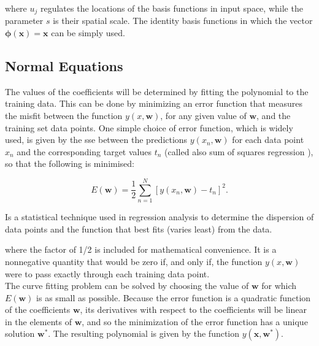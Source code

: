 \noindent where $u_j$ regulates the locations of the basis functions in input space, while the parameter $s$ is their spatial scale.
\noindent The identity basis functions in which the vector $\bm{\phi}(\bm{x})=\bm{x}$ can be simply used.

\subsection{Normal Equations}
\label{subsec:reglinmulnormeq}
The values of the coefficients will be determined by fitting the polynomial to the training data. This can be done by minimizing an error function that measures the misfit between the function $y(x, \bm{w})$, for any given value of $\bm{w}$, and the training set data points. One simple choice of error function, which is widely used, is given by the \gls{sse} between the predictions $y(x_n, \bm{w})$ for each data point $x_n$ and the corresponding target values $t_n$ (called also sum of squares regression \cite[]{sum-squares}), so that the following is minimised:

\begin{Equation}[H]
	\centering
	\begin{equation} \label{eq:sumsquarereg}
		E(\bm{w})=\frac{1}{2} \sum_{n=1}^{N} [y(x_n, \bm{w})-t_n]^2 .
	\end{equation}
	\caption[Sum of squares regression.]{Is a statistical technique used in regression analysis to determine the dispersion of data points and the function that best fits (varies least) from the data.}
\end{Equation}

\noindent where the factor of 1/2 is included for mathematical convenience. It is a nonnegative quantity that would be zero if, and only if, the function $y(x, \bm{w})$ were to pass exactly through each training data point. \\

\noindent The curve fitting problem can be solved by choosing the value of $\bm{w}$ for which $E(\bm{w})$ is as small as possible. Because the error function is a quadratic function of the coefficients $\bm{w}$, its derivatives with respect to the coefficients will be linear in the elements of $\bm{w}$, and so the minimization of the error function has a unique solution $\bm{w^*}$. The resulting polynomial is given by the function $y(\bm{x}, \bm{w^*})$. \\


